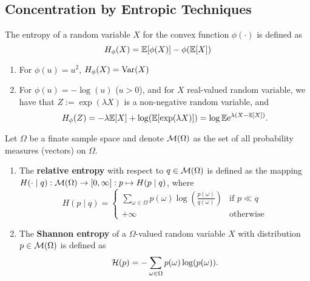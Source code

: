 \chapter{}

\section{Concentration by Entropic Techniques}

\begin{definition}[Entropy]
	The entropy of a random variable \(X\) for the convex function \(\phi(\cdot)\) is defined as
	\begin{equation}
		H_{\phi}(X)=\mathbb{E}[\phi(X)]-\phi(\mathbb{E}[X])
	\end{equation}
\end{definition}

\begin{example}
	\begin{enumerate}
		\item For \(\phi(u)=u^2\), \(H_{\phi}(X)=\mathrm{Var}(X)\)
		\item For \(\phi(u)=-\log(u)\) (\(u>0\)), and for \(X\) real-valued random variable, we have that \(Z:=\exp(\lambda X)\) is a non-negative random variable, and
		      \begin{equation}
			      H_{\phi}(Z)=-\lambda\mathbb{E}[X]+\log(\mathbb{E}[\exp(\lambda X)])=\log\mathbb{E}\mathrm{e}^{\lambda(X-\mathbb{E}[X])}.
		      \end{equation}
	\end{enumerate}
\end{example}

\begin{definition}
	Let \(\Omega\) be a finate sample space and denote \(\mathcal{M}(\Omega)\) as the set of all probability measures (vectors) on \(\Omega\).
	\begin{enumerate}
		\item The \textbf{relative entropy} with respect to \(q\in\mathcal{M}(\Omega)\) is defined as the mapping \(H(\cdot\mid q):\mathcal{M}(\Omega)\to[0, \infty]:p\mapsto H(p\mid q)\), where
		      \begin{equation}
			      H(p\mid q)=\left\{
			      \begin{array}{ll}
				      \sum_{\omega\in\Omega}p(\omega)\log\left(\frac{p(\omega)}{q(\omega)}\right) & \text{if }p\ll q \\
				      +\infty                                                                     & \text{otherwise}
			      \end{array}
			      \right.
		      \end{equation}
		\item The \textbf{Shannon entropy} of a \(\Omega\)-valued random variable \(X\) with distribution \(p\in\mathcal{M}(\Omega)\) is defined as
		      \begin{equation}
			      \mathcal{H}(p)=-\sum_{\omega\in\Omega}p(\omega)\log(p(\omega)).
		      \end{equation}
	\end{enumerate}
\end{definition}

